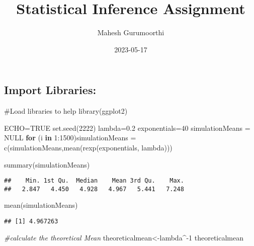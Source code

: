\documentclass[
]{article}
\title{Statistical Inference Assignment}
\author{Mahesh Gurumoorthi}
\date{2023-05-17}
\newenvironment{Shaded}{\begin{snugshade}}{\end{snugshade}}
\newcommand{\CommentTok}[1]{\textcolor[rgb]{0.56,0.35,0.01}{\textit{#1}}}
\newcommand{\ConstantTok}[1]{\textcolor[rgb]{0.00,0.00,0.00}{#1}}
\newcommand{\ControlFlowTok}[1]{\textcolor[rgb]{0.13,0.29,0.53}{\textbf{#1}}}
\newcommand{\DecValTok}[1]{\textcolor[rgb]{0.00,0.00,0.81}{#1}}
\newcommand{\FloatTok}[1]{\textcolor[rgb]{0.00,0.00,0.81}{#1}}
\newcommand{\FunctionTok}[1]{\textcolor[rgb]{0.00,0.00,0.00}{#1}}
\newcommand{\NormalTok}[1]{#1}
\newcommand{\OtherTok}[1]{\textcolor[rgb]{0.56,0.35,0.01}{#1}}
\newcommand{\SpecialCharTok}[1]{\textcolor[rgb]{0.00,0.00,0.00}{#1}}
\begin{document}
\maketitle

\hypertarget{import-libraries}{%
\subsection{Import Libraries:}\label{import-libraries}}

\#Load libraries to help library(ggplot2)

\begin{Shaded}
\begin{Highlighting}[]
\NormalTok{ECHO}\OtherTok{=}\ConstantTok{TRUE}
\FunctionTok{set.seed}\NormalTok{(}\DecValTok{2222}\NormalTok{)}
\NormalTok{lambda}\OtherTok{=}\FloatTok{0.2}
\NormalTok{exponentials}\OtherTok{=}\DecValTok{40}
\NormalTok{simulationMeans }\OtherTok{=} \ConstantTok{NULL}
\ControlFlowTok{for}\NormalTok{ (i }\ControlFlowTok{in} \DecValTok{1}\SpecialCharTok{:}\DecValTok{1500}\NormalTok{)simulationMeans }\OtherTok{=} \FunctionTok{c}\NormalTok{(simulationMeans,}\FunctionTok{mean}\NormalTok{(}\FunctionTok{rexp}\NormalTok{(exponentials, lambda)))}

\FunctionTok{summary}\NormalTok{(simulationMeans)}
\end{Highlighting}
\end{Shaded}

\begin{verbatim}
##    Min. 1st Qu.  Median    Mean 3rd Qu.    Max. 
##   2.847   4.450   4.928   4.967   5.441   7.248
\end{verbatim}

\begin{Shaded}
\begin{Highlighting}[]
\FunctionTok{mean}\NormalTok{(simulationMeans)}
\end{Highlighting}
\end{Shaded}

\begin{verbatim}
## [1] 4.967263
\end{verbatim}

\begin{Shaded}
\begin{Highlighting}[]
\CommentTok{\#calculate the theoretical Mean}
\NormalTok{theoreticalmean}\OtherTok{\textless{}{-}}\NormalTok{lambda}\SpecialCharTok{\^{}{-}}\DecValTok{1}
\NormalTok{theoreticalmean}
\end{Highlighting}
\end{Shaded}
\end{document}
